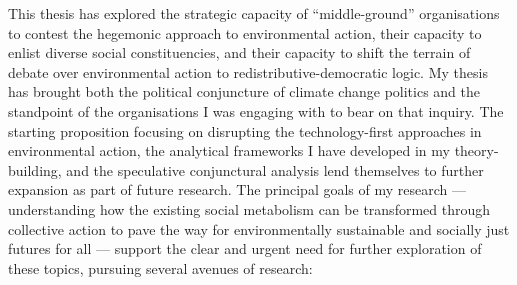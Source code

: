 \documentclass[a4paper, nobind]{templates/ociamthesis}
\begin{document}
This thesis has explored the strategic capacity of ``middle-ground'' organisations to contest the hegemonic approach to environmental action, their capacity to enlist diverse social constituencies, and their capacity to shift the terrain of debate over environmental action to redistributive-democratic logic. My thesis has brought both the political conjuncture of climate change politics and the standpoint of the organisations I was engaging with to bear on that inquiry. The starting proposition focusing on disrupting the technology-first approaches in environmental action, the analytical frameworks I have developed in my theory-building, and the speculative conjunctural analysis lend themselves to further expansion as part of future research. The principal goals of my research --- understanding how the existing social metabolism can be transformed through collective action to pave the way for environmentally sustainable and socially just futures for all --- support the clear and urgent need for further exploration of these topics, pursuing several avenues of research:
\end{document}
